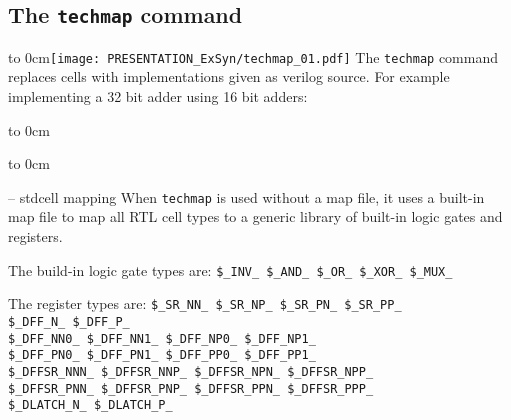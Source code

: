 
\subsection{The {\tt techmap} command}

\begin{frame}[t]{\subsecname}
\vbox to 0cm{\texttt{[image: PRESENTATION\_ExSyn/techmap\_01.pdf]}\vss}
\vskip-0.8cm
The {\tt techmap} command replaces cells with implementations given as
verilog source. For example implementing a 32 bit adder using 16 bit adders:

\vbox to 0cm{
\vskip-0.3cm

}\vbox to 0cm{
\vskip-0.5cm


}
\end{frame}

\begin{frame}[t]{\subsecname{} -- stdcell mapping}
When {\tt techmap} is used without a map file, it uses a built-in map file
to map all RTL cell types to a generic library of built-in logic gates and registers.

\bigskip
\begin{block}{The build-in logic gate types are:}
{\tt \$\_INV\_ \$\_AND\_ \$\_OR\_ \$\_XOR\_ \$\_MUX\_}
\end{block}

\bigskip
\begin{block}{The register types are:}
{\tt \$\_SR\_NN\_ \$\_SR\_NP\_ \$\_SR\_PN\_ \$\_SR\_PP\_ \\
\$\_DFF\_N\_ \$\_DFF\_P\_ \\
\$\_DFF\_NN0\_ \$\_DFF\_NN1\_ \$\_DFF\_NP0\_ \$\_DFF\_NP1\_ \\
\$\_DFF\_PN0\_ \$\_DFF\_PN1\_ \$\_DFF\_PP0\_ \$\_DFF\_PP1\_ \\
\$\_DFFSR\_NNN\_ \$\_DFFSR\_NNP\_ \$\_DFFSR\_NPN\_ \$\_DFFSR\_NPP\_ \\
\$\_DFFSR\_PNN\_ \$\_DFFSR\_PNP\_ \$\_DFFSR\_PPN\_ \$\_DFFSR\_PPP\_ \\
\$\_DLATCH\_N\_ \$\_DLATCH\_P\_}
\end{block}
\end{frame}

